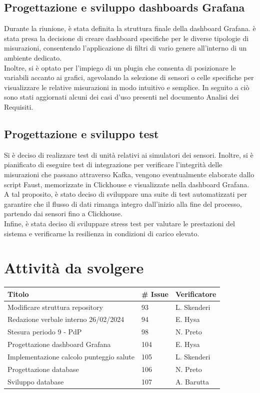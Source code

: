 \documentclass{article}
\begin{document}
    \subsection{Progettazione e sviluppo dashboards Grafana}
    Durante la riunione, è stata definita la struttura finale della dashboard Grafana. è stata presa la decisione di creare dashboard specifiche per le diverse tipologie di misurazioni, consentendo l'applicazione di filtri di vario genere all'interno di un ambiente dedicato. \\
    Inoltre, si è optato per l'impiego di un plugin che consenta di posizionare le variabili accanto ai grafici, agevolando la selezione di sensori o celle specifiche per visualizzare le relative misurazioni in modo intuitivo e semplice. In seguito a ciò sono stati aggiornati alcuni dei casi d’uso presenti nel documento Analisi dei Requisiti.

    \subsection{Progettazione e sviluppo test}
    Si è deciso di realizzare test di unità relativi ai simulatori dei sensori. Inoltre, si è pianificato di eseguire test di integrazione per verificare l'integrità delle misurazioni che passano attraverso Kafka, vengono eventualmente elaborate dallo script Faust, memorizzate in Clickhouse e visualizzate nella dashboard Grafana. A tal proposito, è stato deciso di sviluppare una suite di test automatizzati per garantire che il flusso di dati rimanga integro dall'inizio alla fine del processo, partendo dai sensori fino a Clickhouse. \\
    Infine, è stata deciso di sviluppare stress test per valutare le prestazioni del sistema e verificarne la resilienza in condizioni di carico elevato.

\section{Attività da svolgere}
    \begin{center}
        \begin{tabular}{|C{7cm}|C{1,5cm}|C{3cm}|}
            \hline
            \textbf{Titolo} & \textbf{\# Issue} & \textbf{Verificatore} \\
            \hline\hline
            Modificare struttura repository & 93 & L. Skenderi \\
            Redazione verbale interno 26/02/2024 & 94 & E. Hysa \\
            Stesura periodo 9 - PdP & 98 & N. Preto \\
            Progettazione dashboard Grafana & 104 & E. Hysa \\
            Implementazione calcolo punteggio salute & 105 & L. Skenderi \\
            Progettazione database & 106 & N. Preto \\
            Sviluppo database & 107 & A. Barutta \\
            \hline
        \end{tabular}
    \end{center}
\end{document}
